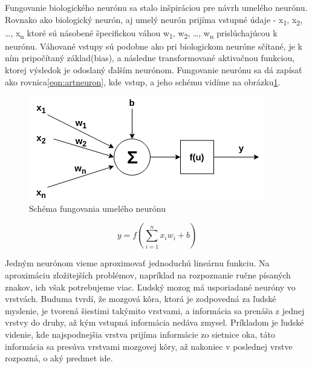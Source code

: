 \indent Fungovanie biologického neurónu sa stalo inšpiráciou pre návrh umelého neurónu.
Rovnako ako biologický neurón, aj umelý neurón prijíma vstupné údaje - x\textsubscript{1},  x\textsubscript{2}, \dots,  x\textsubscript{n} ktoré sú násobené špecifickou váhou w\textsubscript{1},  w\textsubscript{2}, \dots,  w\textsubscript{n} prislúchajúcou k neurónu.
Váhované vstupy sú podobne ako pri biologickom neuróne sčítané, je k ním pripočítaný
základ(bias), a následne transformované aktivačnou funkciou, ktorej výsledok je odoslaný ďalším neurónom. Fungovanie neurónu sa dá zapísať ako rovnica\eqref{eqn:artneuron}, kde vstup, a jeho schému vidíme na obrázku\ref{fig:artneuron}.

\begin{figure}[H]
	\centering
	\includegraphics[width=0.7\linewidth]{img/artneuron}
	\caption{Schéma fungovania umelého neurónu}
	\label{fig:artneuron}
\end{figure}

\begin{equation}\label{eqn:artneuron}
y = f(\sum\limits_{i=1}^n x_{i}w_{i} + b)
\end{equation}

\indent Jedným neurónom vieme aproximovať jednoduchú lineárnu funkciu.
Na aproximáciu zložitejších problémov, napríklad na rozpoznanie ručne písaných znakov, ich však potrebujeme viac.
Ľudský mozog má usporiadané neuróny vo vrstvách.
Buduma tvrdí, že mozgová kôra, ktorá je zodpovedná za ľudské myslenie, je tvorená šiestimi takýmito vrstvami\cite{buduma2017fundamentals}, a informácia sa prenáša z jednej vrstvy do druhy, až kým vstupná informácia nedáva zmysel.
Príkladom je ľudské videnie, kde najspodnejšia vrstva prijíma informácie zo sietnice oka, táto informácia sa presúva vrstvami mozgovej kôry, až nakoniec v poslednej vrstve rozpozná, o aký predmet ide.\\

